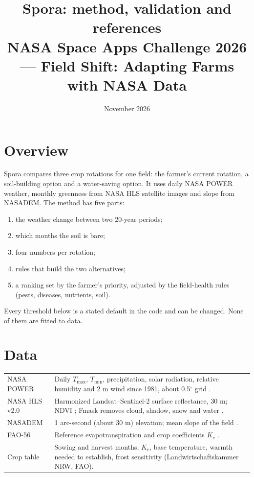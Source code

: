 \documentclass[11pt,a4paper]{article}
\title{\textbf{Spora: method, validation and references}\\[2pt]\large NASA Space Apps Challenge 2026 --- Field Shift: Adapting Farms with NASA Data}
\date{November 2026}
\begin{document}
\maketitle

\section{Overview}
Spora compares three crop rotations for one field: the farmer's current rotation, a soil-building
option and a water-saving option. It uses daily NASA POWER weather, monthly greenness from NASA HLS
satellite images and slope from NASADEM. The method has five parts:
\begin{enumerate}
\item the weather change between two 20-year periods;
\item which months the soil is bare;
\item four numbers per rotation;
\item rules that build the two alternatives;
\item a ranking set by the farmer's priority, adjusted by the field-health rules (pests, diseases, nutrients, soil).
\end{enumerate}
Every threshold below is a stated default in the code and can be changed. None of them are fitted to data.

\section{Data}
\begin{tabular}{@{}p{3.6cm}p{11.4cm}@{}}
\toprule
NASA POWER & Daily $T_{\max}$, $T_{\min}$, precipitation, solar radiation, relative humidity and 2 m wind since 1981, about 0.5$^\circ$ grid \cite{power}.\\
NASA HLS v2.0 & Harmonized Landsat--Sentinel-2 surface reflectance, 30 m; NDVI \cite{tucker1979}; Fmask removes cloud, shadow, snow and water \cite{claverie2018}.\\
NASADEM & 1 arc-second (about 30 m) elevation; mean slope of the field \cite{nasadem}.\\
FAO-56 & Reference evapotranspiration and crop coefficients $K_c$ \cite{fao56}.\\
Crop table & Sowing and harvest months, $K_c$, base temperature, warmth needed to establish, frost sensitivity (Landwirtschaftskammer NRW, FAO).\\
\bottomrule
\end{tabular}
\end{document}
